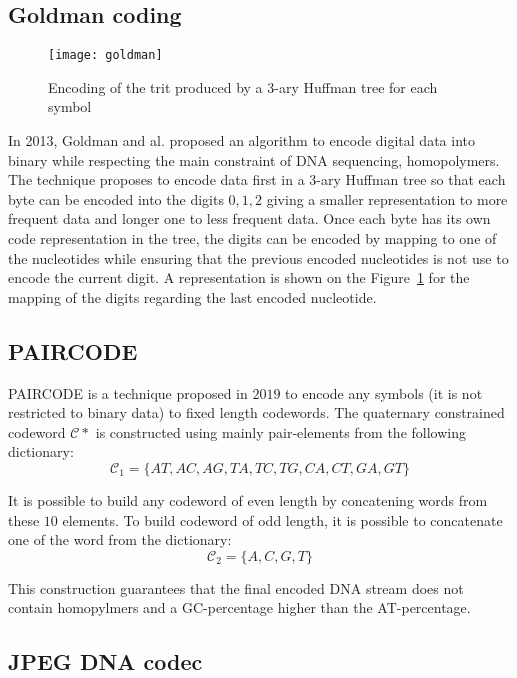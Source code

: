 
\subsection{Goldman coding}
\begin{figure}
    \centering
    \texttt{[image: goldman]}
    \caption{Encoding of the trit produced by a 3-ary Huffman tree for each symbol}
    \label{fig:goldman}
\end{figure}

In 2013, Goldman and al. \cite{bib:goldman} proposed an algorithm to encode digital data into binary while respecting the main constraint of DNA sequencing, homopolymers. 
The technique proposes to encode data first in a 3-ary Huffman tree so that each byte can be encoded into the digits $0,1,2$ giving a smaller representation to more frequent data and longer one to less frequent data. 
Once each byte has its own code representation in the tree, the digits can be encoded by mapping to one of the nucleotides while ensuring that the previous encoded nucleotides is not use to encode the current digit. A representation is shown on the Figure~\ref{fig:goldman} for the mapping of the digits regarding the last encoded nucleotide.

\subsection{PAIRCODE}

PAIRCODE \cite{bib:paircode} is a technique proposed in $2019$ to encode any symbols (it is not restricted to binary data) to fixed length codewords.
The quaternary constrained codeword $\mathcal{C}*$ is constructed using mainly pair-elements from the following dictionary:
$$
\mathcal{C}_1=\{AT,AC,AG,TA,TC,TG,CA,CT,GA,GT\}
$$

It is possible to build any codeword of even length by concatening words from these $10$ elements. To build codeword of odd length, it is possible to concatenate one of the word from the dictionary:
$$
\mathcal{C}_2=\{A,C,G,T\}
$$

This construction guarantees that the final encoded DNA stream does not contain homopylmers and a GC-percentage higher than the AT-percentage.



\subsection{JPEG DNA codec}

